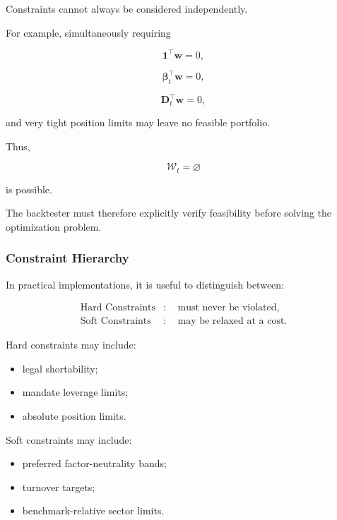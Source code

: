 \documentclass[11pt,a4paper]{article}
\begin{document}
Constraints cannot always be considered independently.

For example, simultaneously requiring

\begin{equation}
\mathbf{1}^{\top}\mathbf{w}=0,
\end{equation}

\begin{equation}
\boldsymbol{\beta}_t^\top\mathbf{w}=0,
\end{equation}

\begin{equation}
\mathbf{D}_t^\top\mathbf{w}=0,
\end{equation}

and very tight position limits may leave no feasible portfolio.

Thus,

\begin{equation}
\boxed{
\mathcal{W}_t
=
\varnothing
}
\end{equation}

is possible.

The backtester must therefore explicitly verify feasibility before solving the
optimization problem.


\subsubsection{Constraint Hierarchy}

In practical implementations, it is useful to distinguish between:

\begin{equation}
\boxed{
\begin{aligned}
\text{Hard Constraints}
&:
\quad
\text{must never be violated},
\\
\text{Soft Constraints}
&:
\quad
\text{may be relaxed at a cost}.
\end{aligned}
}
\end{equation}

Hard constraints may include:

\begin{itemize}
    \item legal shortability;
    \item mandate leverage limits;
    \item absolute position limits.
\end{itemize}

Soft constraints may include:

\begin{itemize}
    \item preferred factor-neutrality bands;
    \item turnover targets;
    \item benchmark-relative sector limits.
\end{itemize}
\end{document}
